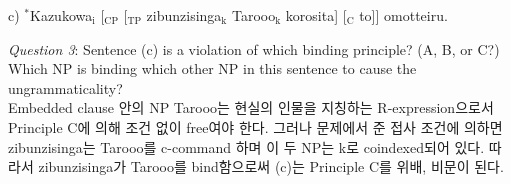 \documentclass[10pt]{article}
\begin{document}
c) $^*$Kazukowa$_{\text{i}}$ [$_{\text{CP}}$ [$_{\text{TP}}$ zibunzisinga$_{\text{k}}$ Tarooo$_{\text{k}}$ korosita] [$_{\text{C}}$  to]] omotteiru.\\
\newline
\begin{spacing}{1.5}
\noindent
\textit{Question 3}: Sentence (c) is a violation of which binding principle? (A, B, or C?) Which NP is binding which other NP in this sentence to cause the ungrammaticality?\\
Embedded clause 안의 NP Tarooo는 현실의 인물을 지칭하는 R-expression으로서 Principle C에 의해 조건 없이 free여야 한다. 그러나 문제에서 준 접사 조건에 의하면 zibunzisinga는 Tarooo를 c-command 하며 이 두 NP는 k로 coindexed되어 있다. 따라서 zibunzisinga가 Tarooo를 bind함으로써 (c)는 Principle C를 위배, 비문이 된다.\\
\end{spacing}
 
\end{document}
